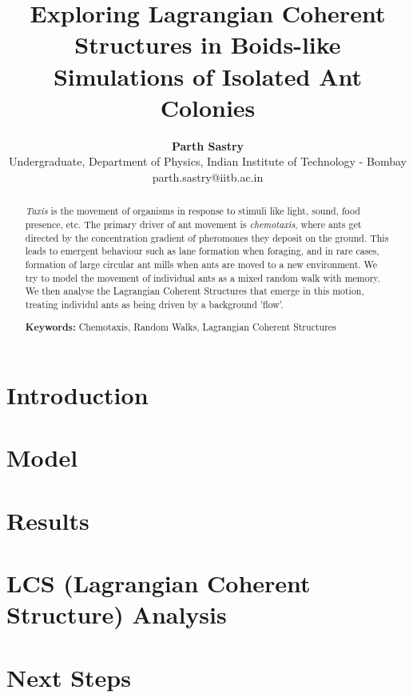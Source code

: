 \documentclass{eusflat2019}
\title{\bf Exploring Lagrangian Coherent Structures in Boids-like Simulations of Isolated Ant Colonies}
\author{{\bf Parth Sastry}\\
Undergraduate, Department of Physics, Indian Institute of Technology - Bombay \\ parth.sastry@iitb.ac.in}
\begin{document}
\maketitle
\begin{abstract}
\textit{Taxis} is the movement of organisms in response to stimuli like light, sound, food presence, etc. The primary driver of ant movement is \textit{chemotaxis}, where ants get directed by the concentration gradient of pheromones they deposit on the ground. This leads to emergent behaviour such as lane formation when foraging, and in rare cases, formation of large circular ant mills when ants are moved to a new environment. We try to model the movement of individual ants as a mixed random walk with memory. We then analyse the Lagrangian Coherent Structures that emerge in this motion, treating individul ants as being driven by a background 'flow'.

{\bf Keywords:} Chemotaxis, Random Walks, Lagrangian Coherent Structures
\end{abstract}

\section{Introduction}
\label{section:intro}


\section{Model}
\label{section:model}


\section{Results}
\label{section:results}


\section{LCS (Lagrangian Coherent Structure) Analysis} 
\label{section:LCS}


\section{Next Steps}
\label{sec:nextsteps}




\end{document}

